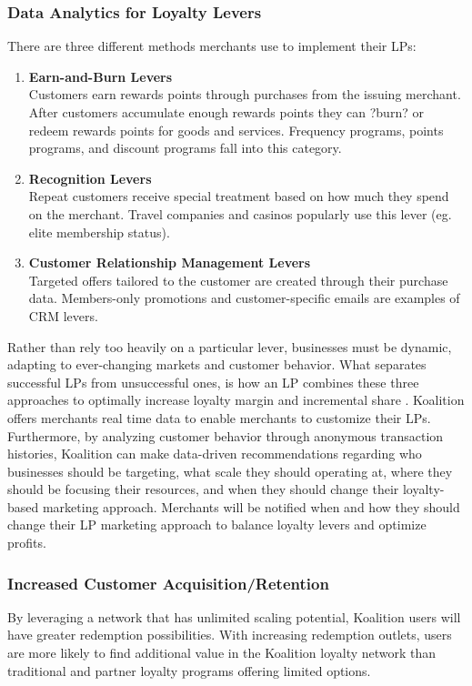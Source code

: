 \subsubsection{Data Analytics for Loyalty Levers}
There are three different methods merchants use to implement their LPs:
%
\begin{enumerate}
\item \textbf{Earn-and-Burn Levers} \\ 
Customers earn rewards points through purchases from the issuing merchant. After customers accumulate enough rewards points they can ?burn? or redeem rewards points for goods and services. Frequency programs, points programs, and discount programs fall into this category.

\item \textbf{Recognition Levers} \\ 
Repeat customers receive special treatment based on how much they spend on the merchant. Travel companies and casinos popularly use this lever (eg. elite membership status).

\item \textbf{Customer Relationship Management Levers} \\ 
Targeted offers tailored to the customer are created through their purchase data. Members-only promotions and customer-specific emails are examples of CRM levers.
\end{enumerate}

Rather than rely too heavily on a particular lever, businesses must be dynamic, adapting to ever-changing markets and customer behavior. What separates successful LPs from unsuccessful ones, is how an LP combines these three approaches to optimally increase loyalty margin and incremental share \cite{Bolden14}. Koalition offers merchants real time data to enable merchants to customize their LPs. Furthermore, by analyzing customer behavior through anonymous transaction histories, Koalition can make data-driven recommendations regarding who businesses should be targeting, what scale they should operating at, where they should be focusing their resources, and when they should change their loyalty-based marketing approach. Merchants will be notified when and how they should change their LP marketing approach to balance loyalty levers and optimize profits.

\subsubsection{Increased Customer Acquisition/Retention}
By leveraging a network that has unlimited scaling potential, Koalition users will have greater redemption possibilities.  With increasing redemption outlets, users are more likely to find additional value in the Koalition loyalty network than traditional and partner loyalty programs offering limited options.  

